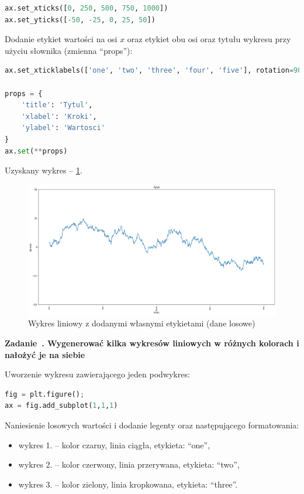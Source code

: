 \documentclass[11pt]{report}
\newcounter{zadanie}
\newcommand{\zadanie}[1]{
    \refstepcounter{zadanie}
    \filbreak\vspace*{1cm}
    {\noindent\raggedright\Large \textbf{Zadanie~\thezadanie. #1}}
    \vspace{10 pt}\nopagebreak[1]
}
\begin{document}
\begin{lstlisting}[language=Python]
ax.set_xticks([0, 250, 500, 750, 1000])
ax.set_yticks([-50, -25, 0, 25, 50])
\end{lstlisting}

Dodanie etykiet wartości na osi $x$ oraz etykiet obu osi oraz tytułu wykresu przy użyciu słownika (zmienna \enquote{props}):

\begin{lstlisting}[language=Python]
ax.set_xticklabels(['one', 'two', 'three', 'four', 'five'], rotation=90, fontsize='small')

props = {
    'title': 'Tytul',
    'xlabel': 'Kroki',
    'ylabel': 'Wartosci'
}
ax.set(**props)
\end{lstlisting}

Uzyskany wykres -- \ref{fig:wykres6}.

\begin{figure}[h]
    \caption{Wykres liniowy z dodanymi własnymi etykietami (dane losowe)}
    \label{fig:wykres6}
    \centering
    \includegraphics[width=.8\textwidth]{output_8_0}
\end{figure}

\zadanie{Wygenerować kilka wykresów liniowych w różnych kolorach i nałożyć je na siebie}

Uworzenie wykresu zawierającego jeden podwykres:

\begin{lstlisting}[language=Python]
fig = plt.figure(); 
ax = fig.add_subplot(1,1,1)
\end{lstlisting}

Naniesienie losowych wartości i dodanie legenty oraz następującego formatowania:

\begin{itemize}
    \item wykres 1. -- kolor czarny, linia ciągła, etykieta: \enquote{one},
    \item wykres 2. -- kolor czerwony, linia przerywana, etykieta: \enquote{two},
    \item wykres 3. -- kolor zielony, linia kropkowana, etykieta: \enquote{three}.
\end{itemize}
\end{document}
